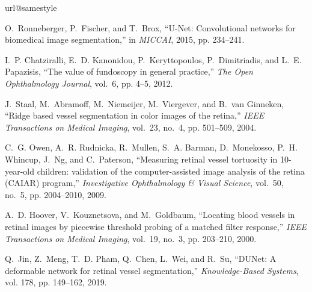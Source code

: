 \documentclass[10pt,twocolumn,letterpaper]{article}
\begin{document}
{\small
\begin{thebibliography}{10}
	\providecommand{\url}[1]{#1}
	\csname url@samestyle\endcsname
	\providecommand{\newblock}{\relax}
	\providecommand{\bibinfo}[2]{#2}
	\providecommand{\BIBentrySTDinterwordspacing}{\spaceskip=0pt\relax}
	\providecommand{\BIBentryALTinterwordstretchfactor}{4}
	\providecommand{\BIBentryALTinterwordspacing}{\spaceskip=\fontdimen2\font plus
		\BIBentryALTinterwordstretchfactor\fontdimen3\font minus
		\fontdimen4\font\relax}
	\providecommand{\BIBforeignlanguage}[2]{{\expandafter\ifx\csname l@#1\endcsname\relax
			\typeout{** WARNING: IEEEtran.bst: No hyphenation pattern has been}\typeout{** loaded for the language `#1'. Using the pattern for}\typeout{** the default language instead.}\else
			\language=\csname l@#1\endcsname
			\fi
			#2}}
	\providecommand{\BIBdecl}{\relax}
	\BIBdecl
	
	O.~Ronneberger, P.~Fischer, and T.~Brox, ``{U-Net}: Convolutional networks for
	biomedical image segmentation,'' in \emph{MICCAI}, 2015, pp. 234--241.
	
	I.~P. Chatziralli, E.~D. Kanonidou, P.~Keryttopoulos, P.~Dimitriadis, and L.~E.
	Papazisis, ``The value of fundoscopy in general practice,'' \emph{The Open
		Ophthalmology Journal}, vol.~6, pp. 4--5, 2012.
	
	J.~Staal, M.~Abramoff, M.~Niemeijer, M.~Viergever, and B.~van Ginneken,
	``{Ridge based vessel segmentation in color images of the retina},''
	\emph{{IEEE Transactions on Medical Imaging}}, vol.~23, no.~4, pp. 501--509,
	2004.
	
	C.~G. Owen, A.~R. Rudnicka, R.~Mullen, S.~A. Barman, D.~Monekosso, P.~H.
	Whincup, J.~Ng, and C.~Paterson, ``Measuring retinal vessel tortuosity in
	10-year-old children: validation of the computer-assisted image analysis of
	the retina ({CAIAR}) program,'' \emph{Investigative Ophthalmology \& Visual
		Science}, vol.~50, no.~5, pp. 2004--2010, 2009.
	
	A.~D. {Hoover}, V.~{Kouznetsova}, and M.~{Goldbaum}, ``Locating blood vessels
	in retinal images by piecewise threshold probing of a matched filter
	response,'' \emph{IEEE Transactions on Medical Imaging}, vol.~19, no.~3, pp.
	203--210, 2000.
	
	Q.~Jin, Z.~Meng, T.~D. Pham, Q.~Chen, L.~Wei, and R.~Su, ``{DUNet}: A
	deformable network for retinal vessel segmentation,'' \emph{Knowledge-Based
		Systems}, vol. 178, pp. 149--162, 2019.
	

\end{thebibliography}}
\end{document}

